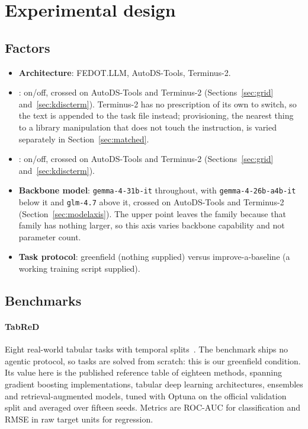 \section{Experimental design}
\label{sec:design}

\subsection{Factors}

\begin{itemize}
  \item \textbf{Architecture}: FEDOT.LLM, AutoDS-Tools, Terminus-2.
  \item \textbf{\Ktool{}}: on/off, crossed on AutoDS-Tools and Terminus-2
        (Sections~\ref{sec:grid} and~\ref{sec:kdiscterm}). Terminus-2 has no
        prescription of its own to switch, so the text is appended to the task
        file instead; provisioning, the nearest thing to a library manipulation
        that does not touch the instruction, is varied separately in
        Section~\ref{sec:matched}.
  \item \textbf{\Kdisc{}}: on/off, crossed on AutoDS-Tools and
        Terminus-2 (Sections~\ref{sec:grid} and~\ref{sec:kdiscterm}).
  \item \textbf{Backbone model}: \texttt{gemma-4-31b-it} throughout, with
        \texttt{gemma-4-26b-a4b-it} below it and \texttt{glm-4.7} above it,
        crossed on AutoDS-Tools and Terminus-2 (Section~\ref{sec:modelaxis}). The
        upper point leaves the family because that family has nothing larger, so
        this axis varies backbone capability and not parameter count.
  \item \textbf{Task protocol}: greenfield (nothing supplied) versus
        improve-a-baseline (a working training script supplied).
\end{itemize}

\subsection{Benchmarks}

\paragraph{TabReD} Eight real-world tabular tasks with temporal
splits~\citep{rubachev2024tabred}. The benchmark ships no agentic protocol, so
tasks are solved from scratch: this is our greenfield condition. Its value here
is the published reference table of eighteen methods, spanning gradient boosting
implementations, tabular deep learning architectures, ensembles and
retrieval-augmented models, tuned with Optuna on the official validation split
and averaged over fifteen seeds. Metrics are ROC-AUC for classification and RMSE
in raw target units for regression.

